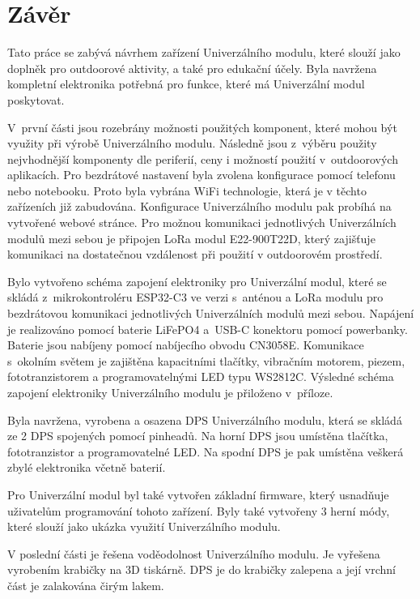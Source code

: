 \chapter*{Závěr}
{}
Tato práce se zabývá návrhem zařízení Univerzálního modulu, které slouží jako doplněk pro outdoorové aktivity, a také pro edukační účely. Byla navržena kompletní 
elektronika potřebná pro funkce, které má Univerzální modul poskytovat. 

V~první části jsou rozebrány možnosti použitých komponent, které mohou být využity při výrobě Univerzálního modulu. Následně jsou z~výběru použity 
nejvhodnější komponenty dle periferií, ceny i možností použití v~outdoorových aplikacích. Pro bezdrátové nastavení byla zvolena konfigurace pomocí telefonu nebo 
notebooku. Proto byla vybrána WiFi technologie, která je v těchto zařízeních již zabudována. Konfigurace Univerzálního modulu pak probíhá na vytvořené webové stránce. 
Pro možnou komunikaci jednotlivých Univerzálních modulů mezi sebou je připojen LoRa modul E22-900T22D, který zajišťuje komunikaci na dostatečnou vzdálenost při použití 
v outdoorovém prostředí. 

Bylo vytvořeno schéma zapojení elektroniky pro Univerzální modul, které se skládá z~mikrokontroléru ESP32-C3 ve verzi s~anténou a LoRa modulu pro 
bezdrátovou komunikaci jednotlivých Univerzálních modulů mezi sebou. Napájení je realizováno pomocí baterie LiFePO4 a~USB-C konektoru pomocí powerbanky. Baterie 
jsou nabíjeny pomocí nabíjecího obvodu CN3058E. Komunikace s~okolním světem je zajištěna kapacitními tlačítky, 
vibračním motorem, piezem, fototranzistorem a programovatelnými LED typu WS2812C. Výsledné schéma zapojení elektroniky Univerzálního modulu je přiloženo v~příloze. 

Byla navržena, vyrobena a osazena DPS Univerzálního modulu, která se skládá ze 2 DPS spojených pomocí pinheadů. Na horní DPS jsou umístěna tlačítka, fototranzistor 
a programovatelné LED. Na spodní DPS je pak umístěna veškerá zbylé elektronika včetně baterií. 

Pro Univerzální modul byl také vytvořen základní firmware, který usnadňuje uživatelům programování tohoto zařízení. Byly také vytvořeny 3 herní módy, které slouží jako ukázka 
využití Univerzálního modulu. 

V poslední části je řešena voděodolnost Univerzálního modulu. Je vyřešena vyrobením krabičky na 3D tiskárně. DPS je do krabičky zalepena a její vrchní část je zalakována čirým
lakem. 
